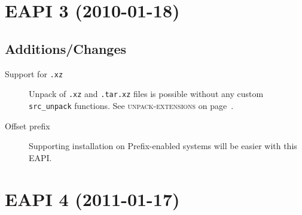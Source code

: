\documentclass[a4paper,nofoldmark]{leaflet}
\newcommand{\code}[1]{\texttt{#1}}
\newcommand{\featureref}[1]{\textsc{#1} on page~\pageref{feat:#1}}
\begin{document}

\section{EAPI 3 (2010-01-18)}
\label{sec:cs:eapi3}
\subsection{Additions/Changes}
\label{sec:cs:eapi3-additions}
\begin{description}
    \item[Support for \code{.xz}] Unpack of \code{.xz} and
    \code{.tar.xz} files is possible without any custom
    \code{src\_unpack} functions.  See \featureref{unpack-extensions}.
    \item[Offset prefix] Supporting installation on Prefix-enabled
    systems will be easier with this EAPI.
\end{description}

\section{EAPI 4 (2011-01-17)}
\label{sec:cs:eapi4}
\end{document}
